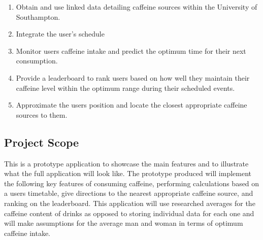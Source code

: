 \begin{enumerate}
	\item{Obtain and use linked data detailing caffeine sources within the University of Southampton.}
	\item{Integrate the user's schedule}
	\item{Monitor users caffeine intake and predict the optimum time for their next consumption.}
	\item{Provide a leaderboard to rank users based on how well they maintain their caffeine level within the optimum range during their scheduled events.}
	\item{Approximate the users position and locate the closest appropriate caffeine sources to them.}
\end{enumerate}

\subsection{Project Scope}
This is a prototype application to showcase the main features and to illustrate what the full application will look like. 
The prototype produced will implement the following key features of consuming caffeine, performing calculations based on a users timetable, give directions to the nearest appropriate caffeine source, and ranking on the leaderboard. 
This application will use researched averages for the caffeine content of drinks as opposed to storing individual data for each one and will make assumptions for the average man and woman in terms of optimum caffeine intake.  
